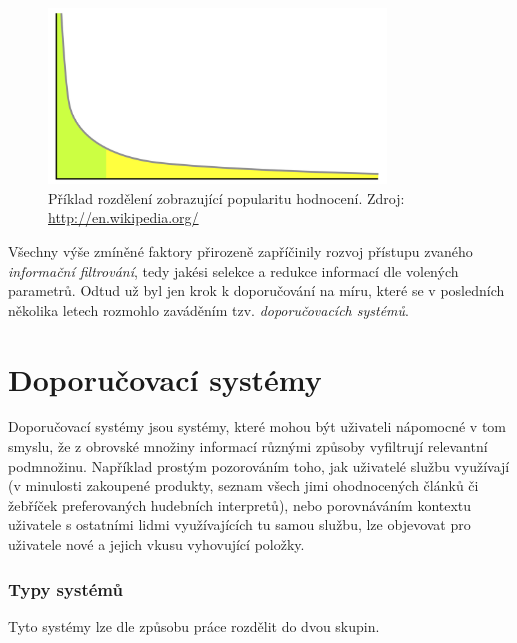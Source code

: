 \documentclass[thesis=M,czech]{FITthesis}[2014/05/07]
\begin{document}
\begin{introduction}
\begin{figure}\centering
	\includegraphics[width=0.8\textwidth]{obr/longtail.png}
 	\caption[Příklad rozdělení zobrazující popularitu hodnocení]{Příklad rozdělení zobrazující popularitu hodnocení. Zdroj: \url{http://en.wikipedia.org/} \cite{wiki:longtail}}\label{fig:longtail}
\end{figure}	

	Všechny výše zmíněné faktory přirozeně zapříčinily rozvoj přístupu zvaného \emph{informační filtrování}, tedy jakési selekce a redukce informací dle volených parametrů. Odtud už byl jen krok k doporučování na míru, které se v posledních několika letech rozmohlo zaváděním tzv. \emph{doporučovacích systémů}.

\section{Doporučovací systémy}
\label{sub:recsys}
 Doporučovací systémy jsou systémy, které mohou být uživateli nápomocné v tom smyslu, že z obrovské množiny informací různými způsoby vyfiltrují relevantní podmnožinu. Například prostým pozorováním toho, jak uživatelé službu využívají (v minulosti zakoupené produkty, seznam všech jimi ohodnocených článků či žebříček preferovaných hudebních interpretů), nebo porovnáváním kontextu uživatele s ostatními lidmi využívajících tu samou službu, lze objevovat pro uživatele nové a jejich vkusu vyhovující položky.
 
\subsubsection{Typy systémů}

Tyto systémy lze dle způsobu práce rozdělit do dvou skupin. 


\end{introduction}
\end{document}
